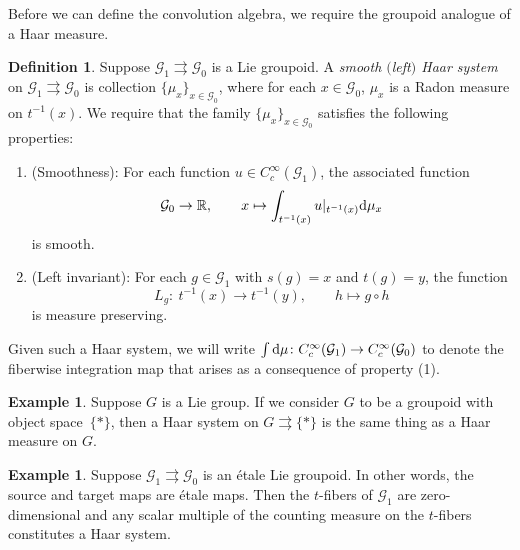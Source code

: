 \documentclass[10pt,a4paper]{amsart}
\numberwithin{equation}{section}
\theoremstyle{definition}
\newtheorem{Definition}[Theorem]{Definition}
\newtheorem{Example}[Theorem]{Example}
\newcommand{\BBR}{\mathbb{R}}
\newcommand{\CG}{\mathcal{G}}
\newcommand{\inv}{^{-1}}
\newcommand{\grpd}{\rightrightarrows}
\begin{document}
Before we can define the convolution algebra, we require the groupoid analogue of a Haar measure.
\begin{Definition}
Suppose $ \CG_1 \grpd \CG_0$ is a Lie groupoid. A \emph{smooth $($left$)$ Haar system} on $ \CG_1 \grpd \CG_0 $ is collection $ \{ \mu_x \}_{x \in \CG_0 } $, where for each $ x \in \CG_0 $, $ \mu_x$ is a Radon measure on $ t\inv(x) $. We require that the family $ \{ \mu_x \}_{x \in \CG_0} $ satisfies the following properties:
\begin{enumerate}\itemsep=0pt
  \item[(1)] (Smoothness): For each function $ u \in C_c^\infty(\CG_1) $, the associated function
  \[ \CG_0 \to \BBR, \qquad x \mapsto \int_{t\inv(x)} u|_{t\inv(x)} {\rm d} \mu_x  \]
  is smooth.
  \item[(2)] (Left invariant): For each $ g \in \CG_1 $ with $ s(g) = x$ and $ t(g) = y $, the function
  \[ L_g \colon\ t\inv(x) \to t\inv(y), \qquad h \mapsto g \circ h \]
  is measure preserving.
\end{enumerate}
\end{Definition}
Given such a Haar system, we will write $ \int {\rm d} \mu \colon C^\infty_c(\CG_1) \to C^\infty_c(\CG_0) $ to denote the fiberwise integration map that arises as a consequence of property (1).
\begin{Example}
Suppose $ G$ is a Lie group. If we consider $ G $ to be a groupoid with object space~$ \{ * \} $, then a Haar system on $ G \grpd \{ * \} $ is the same thing as a Haar measure on $ G $.
\end{Example}
\begin{Example}
   Suppose $ \CG_1 \grpd \CG_0 $ is an \'etale Lie groupoid. In other words, the source and target maps are \'etale maps. Then the $ t $-fibers of $ \CG_1 $ are zero-dimensional and any scalar multiple of the counting measure on the $ t $-fibers constitutes a Haar system.
\end{Example}
\end{document}

